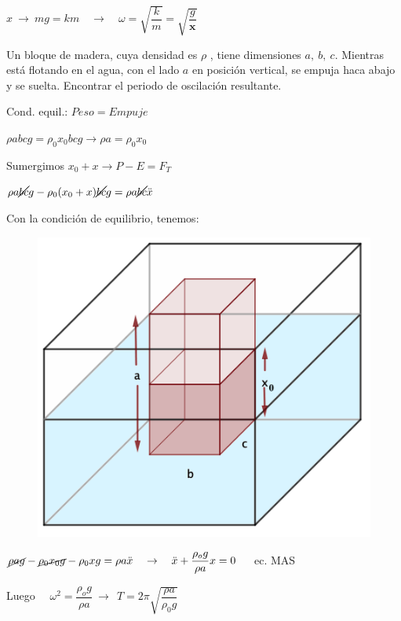 $x \ \to \ mg=km \quad \to \quad \omega=\sqrt{\dfrac k m}=\sqrt{\dfrac{g} {\boldsymbol{x}}}$
\vspace{5mm} %
\begin{prob}
Un bloque de madera, cuya densidad es $\rho$	, tiene dimensiones $a,\ b,\ c$. Mientras está flotando en el agua, con el lado $a$ en posición vertical, se empuja haca abajo y se suelta. Encontrar el periodo de oscilación resultante.
\end{prob}
\vspace{5mm} %
\begin{multicols}{2}
Cond. equil.: $Peso=Empuje$

$\rho abc g=\rho_0 x_0bcg \to \rho a=\rho_0 x_0$

Sumergimos $x_0+x \to P-E=F_T$

$\rho a \cancel{bc} g-\rho_0(x_0+x) \cancel{bc} g=\rho a \cancel{bc}\ddot{x}$

Con la condición de equilibrio, tenemos:

\begin{figure}[H]
		\centering
		\includegraphics[width=.4\textwidth]{imagenes/imagenes21/T21IM08.png}
	\end{figure}	
\end{multicols}

$\cancel{\rho a g}-\cancel{\rho_0x_0g}-\rho_0xg=\rho a \ddot{x} \quad \to \quad \ddot{x}+\dfrac{\rho_o g}{\rho a}x=0\,\quad$ ec. MAS

Luego $\quad \omega^2=\dfrac{\rho_o g}{\rho a} \ \to \ \ T=2\pi \sqrt{\dfrac{\rho a}{\rho_0 g}}$

